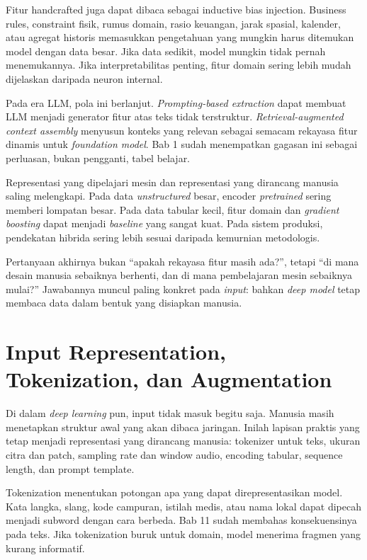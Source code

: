Fitur handcrafted juga dapat dibaca sebagai inductive bias injection. Business rules, constraint fisik, rumus domain, rasio keuangan, jarak spasial, kalender, atau agregat historis memasukkan pengetahuan yang mungkin harus ditemukan model dengan data besar. Jika data sedikit, model mungkin tidak pernah menemukannya. Jika interpretabilitas penting, fitur domain sering lebih mudah dijelaskan daripada neuron internal.

Pada era LLM, pola ini berlanjut. \emph{Prompting-based extraction} dapat membuat LLM menjadi generator fitur atas teks tidak terstruktur. \emph{Retrieval-augmented context assembly} menyusun konteks yang relevan sebagai semacam rekayasa fitur dinamis untuk \emph{foundation model}. Bab 1 sudah menempatkan gagasan ini sebagai perluasan, bukan pengganti, tabel belajar.

Representasi yang dipelajari mesin dan representasi yang dirancang manusia saling melengkapi. Pada data \emph{unstructured} besar, encoder \emph{pretrained} sering memberi lompatan besar. Pada data tabular kecil, fitur domain dan \emph{gradient boosting} dapat menjadi \emph{baseline} yang sangat kuat. Pada sistem produksi, pendekatan hibrida sering lebih sesuai daripada kemurnian metodologis.

Pertanyaan akhirnya bukan ``apakah rekayasa fitur masih ada?'', tetapi ``di mana desain manusia sebaiknya berhenti, dan di mana pembelajaran mesin sebaiknya mulai?'' Jawabannya muncul paling konkret pada \emph{input}: bahkan \emph{deep model} tetap membaca data dalam bentuk yang disiapkan manusia.

\section{Input Representation, Tokenization, dan Augmentation}\label{input-representation-tokenization-dan-augmentation}

Di dalam \emph{deep learning} pun, input tidak masuk begitu saja. Manusia masih menetapkan struktur awal yang akan dibaca jaringan. Inilah lapisan praktis yang tetap menjadi representasi yang dirancang manusia: tokenizer untuk teks, ukuran citra dan patch, sampling rate dan window audio, encoding tabular, sequence length, dan prompt template.

Tokenization menentukan potongan apa yang dapat direpresentasikan model. Kata langka, slang, kode campuran, istilah medis, atau nama lokal dapat dipecah menjadi subword dengan cara berbeda. Bab 11 sudah membahas konsekuensinya pada teks. Jika tokenization buruk untuk domain, model menerima fragmen yang kurang informatif.

